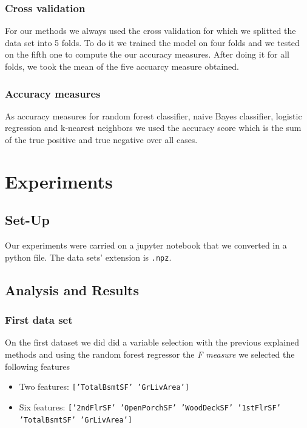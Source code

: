 \documentclass[a4paper,oneside,12pt]{article}
\begin{document}
\subsubsection{Cross validation}
For our methods we always used the cross validation for which we splitted the data set into 5 folds. To do it we trained the model on four folds and we tested on the fifth one to compute the our accuracy measures. After doing it for all folds, we took the mean of the five accuarcy measure obtained.

\subsubsection{Accuracy measures}

As accuracy measures for random forest classifier, naive Bayes classifier, logistic regression and k-nearest neighbors we used the accuracy score which is the sum of the true positive and true negative over all cases.

\section{Experiments}

\subsection{Set-Up}
Our experiments were carried on a jupyter notebook that we converted in a python file. The data sets' extension is \texttt{.npz}.


\subsection{Analysis and Results}

\subsubsection{First data set}

On the first dataset we did did a variable selection with the previous explained methods and using the random forest regressor the \textit{F measure} we selected the following features 

\begin{itemize}
\item Two features: \texttt{['TotalBsmtSF' 'GrLivArea']} 
\item Six features:  \texttt{['2ndFlrSF' 'OpenPorchSF' 'WoodDeckSF' '1stFlrSF' 'TotalBsmtSF' 'GrLivArea']}
\end{itemize}
\end{document}
